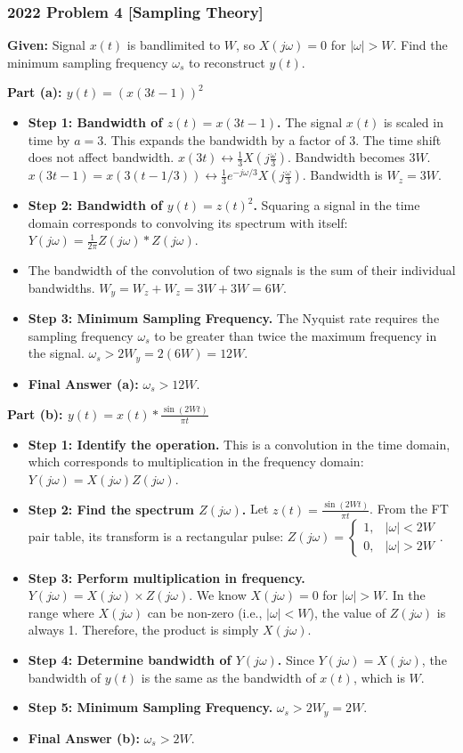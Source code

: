 \documentclass[10pt, twocolumn]{article}
\begin{document}
\subsubsection*{2022 Problem 4 [Sampling Theory]}
\noindent\textbf{Given:} Signal $x(t)$ is bandlimited to $W$, so $X(j\omega)=0$ for $|\omega|>W$. Find the minimum sampling frequency $\omega_s$ to reconstruct $y(t)$.

\noindent\textbf{Part (a): $y(t) = (x(3t-1))^2$}
\begin{itemize}
    \item \textbf{Step 1: Bandwidth of $z(t) = x(3t-1)$.} The signal $x(t)$ is scaled in time by $a=3$. This expands the bandwidth by a factor of 3. The time shift does not affect bandwidth.
    $x(3t) \leftrightarrow \frac{1}{3}X(j\frac{\omega}{3})$. Bandwidth becomes $3W$.
    $x(3t-1) = x(3(t-1/3)) \leftrightarrow \frac{1}{3}e^{-j\omega/3}X(j\frac{\omega}{3})$. Bandwidth is $W_z=3W$.
    \item \textbf{Step 2: Bandwidth of $y(t)=z(t)^2$.} Squaring a signal in the time domain corresponds to convolving its spectrum with itself: $Y(j\omega) = \frac{1}{2\pi}Z(j\omega)*Z(j\omega)$.
    \item The bandwidth of the convolution of two signals is the sum of their individual bandwidths.
    $W_y = W_z + W_z = 3W + 3W = 6W$.
    \item \textbf{Step 3: Minimum Sampling Frequency.} The Nyquist rate requires the sampling frequency $\omega_s$ to be greater than twice the maximum frequency in the signal.
    $\omega_s > 2W_y = 2(6W) = 12W$.
    \item \textbf{Final Answer (a):} $\omega_s > 12W$.
\end{itemize}
\noindent\textbf{Part (b): $y(t) = x(t) * \frac{\sin(2Wt)}{\pi t}$}
\begin{itemize}
    \item \textbf{Step 1: Identify the operation.} This is a convolution in the time domain, which corresponds to multiplication in the frequency domain: $Y(j\omega) = X(j\omega)Z(j\omega)$.
    \item \textbf{Step 2: Find the spectrum $Z(j\omega)$.}
    Let $z(t) = \frac{\sin(2Wt)}{\pi t}$. From the FT pair table, its transform is a rectangular pulse:
    $Z(j\omega) = \begin{cases} 1, & |\omega| < 2W \\ 0, & |\omega| > 2W \end{cases}$.
    \item \textbf{Step 3: Perform multiplication in frequency.}
    $Y(j\omega) = X(j\omega) \times Z(j\omega)$.
    We know $X(j\omega)=0$ for $|\omega|>W$.
    In the range where $X(j\omega)$ can be non-zero (i.e., $|\omega|<W$), the value of $Z(j\omega)$ is always 1.
    Therefore, the product is simply $X(j\omega)$.
    \item \textbf{Step 4: Determine bandwidth of $Y(j\omega)$.} Since $Y(j\omega) = X(j\omega)$, the bandwidth of $y(t)$ is the same as the bandwidth of $x(t)$, which is $W$.
    \item \textbf{Step 5: Minimum Sampling Frequency.}
    $\omega_s > 2W_y = 2W$.
    \item \textbf{Final Answer (b):} $\omega_s > 2W$.
\end{itemize}
\end{document}

